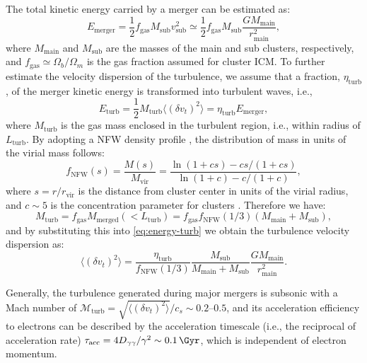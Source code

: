 \documentclass[modern]{aastex61}
\newcommand{\R}[1]{\mathrm{#1}}
\begin{document}
The total kinetic energy carried by a merger can be estimated as:
\begin{equation}
  \label{eq:energy-merger}
  E_{\R{merger}} = \frac{1}{2} f_{\R{gas}} M_{\R{sub}} v^2_{\R{sub}}
    \simeq \frac{1}{2} f_{\R{gas}} M_{\R{sub}} \frac{G M_{\R{main}}}{r^2_{\R{main}}},
\end{equation}
where $M_{\R{main}}$ and $M_{\R{sub}}$ are the masses of the main and sub
clusters, respectively,
and $f_{\R{gas}} \simeq \Omega_b/\Omega_m$ is the gas fraction assumed
for cluster ICM.
To further estimate the velocity dispersion of the turbulence, we assume
that a fraction, $\eta_{\R{turb}}$, of the merger kinetic energy is
transformed into turbulent waves, i.e.,
\begin{equation}
  \label{eq:energy-turb}
  E_{\R{turb}} = \frac{1}{2} M_{\R{turb}} \langle (\delta{v_t})^2 \rangle
    = \eta_{\R{turb}} E_{\R{merger}},
\end{equation}
where
$M_{\R{turb}}$ is the gas mass enclosed in the turbulent region, i.e.,
within radius of $L_{\R{turb}}$.
By adopting a NFW density profile \citep{navarro1997}, the distribution
of mass in units of the virial mass follows:
\begin{equation}
  \label{eq:mass-dist-nfw}
  f_{\R{NFW}}(s) = \frac{M(s)}{M_{\R{vir}}} =
    \frac{\ln(1 + c s) - c s / (1 + c s)}{\ln(1 + c) - c / (1 + c)},
\end{equation}
where $s = r / r_{\R{vir}}$ is the distance from cluster center in units
of the virial radius, and $c \sim 5$ is the concentration parameter for
clusters \citep{lokas2001}.
Therefore we have:
\begin{equation}
  \label{eq:mass-turb}
  M_{\R{turb}} = f_{\R{gas}} M_{\R{merged}}(<L_{\R{turb}})
    = f_{\R{gas}} f_{\R{NFW}}(1/3) (M_{\R{main}} + M_{\R{sub}}),
\end{equation}
and by substituting this into \autoref{eq:energy-turb} we obtain
the turbulence velocity dispersion as:
\begin{equation}
  \label{eq:turb-velocity-dispersion}
  \langle (\delta{v_t})^2 \rangle =
    \frac{\eta_{\R{turb}}}{f_{\R{NFW}}(1/3)}
    \frac{M_{\R{sub}}}{M_{\R{main}} + M_{\R{sub}}}
    \frac{G M_{\R{main}}}{r^2_{\R{main}}}.
\end{equation}

Generally, the turbulence generated during major mergers is subsonic
with a Mach number of
$\mathcal{M}_{\R{turb}} = \sqrt{\langle (\delta{v_t})^2 \rangle} / c_s \sim \numrange{0.2}{0.5}$,
and its acceleration efficiency to electrons can be described by the
acceleration timescale (i.e., the reciprocal of acceleration rate)
$\tau_{\R{acc}} = 4 D_{\gamma\gamma} / \gamma^2 \sim \SI{0.1}{\Gyr}$,
which is independent of electron momentum.
\end{document}
